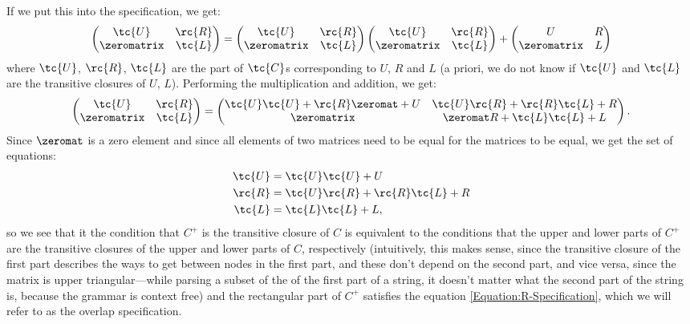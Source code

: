 If we put this into the specification, we get:
\begin{equation*}
  \begin{pmatrix}
    \tc{U} & \rc{R} \\
    \zeromatrix   & \tc{L}
  \end{pmatrix}
  =  
  \begin{pmatrix}
    \tc{U} & \rc{R} \\
    \zeromatrix   & \tc{L}
  \end{pmatrix}
  \begin{pmatrix}
    \tc{U} & \rc{R} \\
    \zeromatrix   & \tc{L}
  \end{pmatrix}
  +
  \begin{pmatrix}
    U & R \\
    \zeromatrix & L
  \end{pmatrix}
\end{equation*}
where $\tc{U}$, $\rc{R}$, $\tc{L}$ are the part of $\tc{C}$s corresponding to $U$, $R$ and $L$ (a priori, we do not know if $\tc{U}$ and $\tc{L}$ are the transitive closures of $U$, $L$). Performing the multiplication and addition, we get:
\begin{equation*}
    \begin{pmatrix}
    \tc{U} & \rc{R} \\
    \zeromatrix   & \tc{L}
  \end{pmatrix} 
    =
  \begin{pmatrix}
    \tc{U}\tc{U} + \rc{R}\zeromat + U   &   \tc{U}\rc{R}     + \rc{R}\tc{L} + R \\
    \zeromatrix                          &   \zeromat R + \tc{L}\tc{L} + L
  \end{pmatrix}.
\end{equation*}
Since $\zeromat$ is a zero element and since all elements of two matrices need to be equal for the matrices to be equal, we get the set of equations:
\begin{align}
  \tc{U} &= \tc{U}\tc{U} + U \\
  \rc{R} &= \tc{U}\rc{R} + \rc{R}\tc{L} + R \label{Equation:R-Specification}\\
  \tc{L} &= \tc{L}\tc{L} + L,
\end{align}
so we see that it the condition that $C^+$ is the transitive closure of $C$ is equivalent to the conditions that the upper and lower parts of $C^+$ are the transitive closures of the upper and lower parts of $C$, respectively (intuitively, this makes sense, since the transitive closure of the first part describes the ways to get between nodes in the first part, and these don't depend on the second part, and vice versa, since the matrix is upper triangular---while parsing a subset of the of the first part of a string, it doesn't matter what the second part of the string is, because the grammar is context free) and the rectangular part of $C^+$ satisfies the equation \eqref{Equation:R-Specification}, which we will refer to as the overlap specification.
